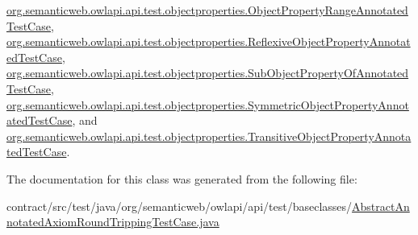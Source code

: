 \hyperlink{classorg_1_1semanticweb_1_1owlapi_1_1api_1_1test_1_1objectproperties_1_1_object_property_range_annotated_test_case_ac333917e7cfcf63921c0b6ec90c5e570}{org.\-semanticweb.\-owlapi.\-api.\-test.\-objectproperties.\-Object\-Property\-Range\-Annotated\-Test\-Case}, \hyperlink{classorg_1_1semanticweb_1_1owlapi_1_1api_1_1test_1_1objectproperties_1_1_reflexive_object_property_annotated_test_case_ad99ac6ad9917c2d5ebed53fe6cfc8adc}{org.\-semanticweb.\-owlapi.\-api.\-test.\-objectproperties.\-Reflexive\-Object\-Property\-Annotated\-Test\-Case}, \hyperlink{classorg_1_1semanticweb_1_1owlapi_1_1api_1_1test_1_1objectproperties_1_1_sub_object_property_of_annotated_test_case_a63ba6ff570b5e61b1a936b0601a73401}{org.\-semanticweb.\-owlapi.\-api.\-test.\-objectproperties.\-Sub\-Object\-Property\-Of\-Annotated\-Test\-Case}, \hyperlink{classorg_1_1semanticweb_1_1owlapi_1_1api_1_1test_1_1objectproperties_1_1_symmetric_object_property_annotated_test_case_a915bab417cbccb23cc0422ed1bafc2e4}{org.\-semanticweb.\-owlapi.\-api.\-test.\-objectproperties.\-Symmetric\-Object\-Property\-Annotated\-Test\-Case}, and \hyperlink{classorg_1_1semanticweb_1_1owlapi_1_1api_1_1test_1_1objectproperties_1_1_transitive_object_property_annotated_test_case_ac02dac319faa9e65ad6daa889d4bba22}{org.\-semanticweb.\-owlapi.\-api.\-test.\-objectproperties.\-Transitive\-Object\-Property\-Annotated\-Test\-Case}.



The documentation for this class was generated from the following file\-:\begin{DoxyCompactItemize}
\item 
contract/src/test/java/org/semanticweb/owlapi/api/test/baseclasses/\hyperlink{_abstract_annotated_axiom_round_tripping_test_case_8java}{Abstract\-Annotated\-Axiom\-Round\-Tripping\-Test\-Case.\-java}\end{DoxyCompactItemize}

